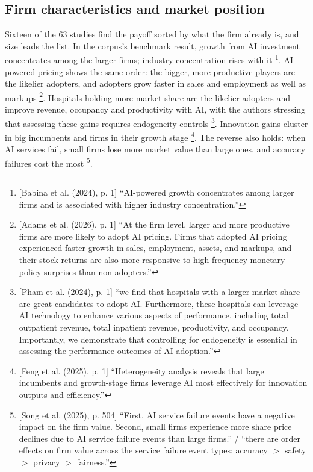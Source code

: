 \subsection{Firm characteristics and market position}
\label{sec:cond-firm}

Sixteen of the 63 studies find the payoff sorted by what the firm already is, and size leads the list. In the corpus's benchmark result, growth from AI investment concentrates among the larger firms; industry concentration rises with it \parencite[p.~1]{babina2024artificial}\footnote{[Babina et al. (2024), p. 1] ``AI-powered growth concentrates among larger firms and is associated with higher industry concentration.''}. AI-powered pricing shows the same order: the bigger, more productive players are the likelier adopters, and adopters grow faster in sales and employment as well as markups \parencite[p.~1]{adams2026rise}\footnote{[Adams et al. (2026), p. 1] ``At the firm level, larger and more productive firms are more likely to adopt AI pricing. Firms that adopted AI pricing experienced faster growth in sales, employment, assets, and markups, and their stock returns are also more responsive to high-frequency monetary policy surprises than non-adopters.''}. Hospitals holding more market share are the likelier adopters and improve revenue, occupancy and productivity with AI, with the authors stressing that assessing these gains requires endogeneity controls \parencite[p.~1]{pham2024determinants}\footnote{[Pham et al. (2024), p. 1] ``we find that hospitals with a larger market share are great candidates to adopt AI. Furthermore, these hospitals can leverage AI technology to enhance various aspects of performance, including total outpatient revenue, total inpatient revenue, productivity, and occupancy. Importantly, we demonstrate that controlling for endogeneity is essential in assessing the performance outcomes of AI adoption.''}. Innovation gains cluster in big incumbents and firms in their growth stage \parencite[p.~1]{feng2025algorithms}\footnote{[Feng et al. (2025), p. 1] ``Heterogeneity analysis reveals that large incumbents and growth-stage firms leverage AI most effectively for innovation outputs and efficiency.''}. The reverse also holds: when AI services fail, small firms lose more market value than large ones, and accuracy failures cost the most \parencite[p.~504]{song2025companies}\footnote{[Song et al. (2025), p. 504] ``First, AI service failure events have a negative impact on the firm value. Second, small firms experience more share price declines due to AI service failure events than large firms.'' / ``there are order effects on firm value across the service failure event types: accuracy $>$ safety $>$ privacy $>$ fairness.''}.


